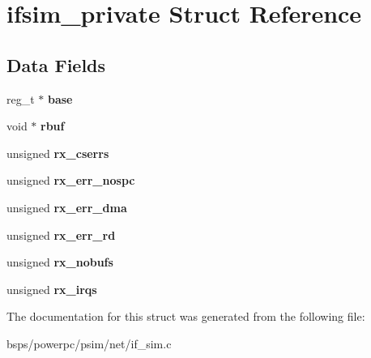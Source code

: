\hypertarget{structifsim__private}{}\section{ifsim\+\_\+private Struct Reference}
\label{structifsim__private}
\subsection*{Data Fields}
\begin{DoxyCompactItemize}
\item 
\mbox{\label{structifsim__private_aae16fc2284c01afe5cfd5db2201ff018}} 
reg\+\_\+t $\ast$ {\bfseries base}
\item 
\mbox{\label{structifsim__private_aa742aa15b1e258383748994f64aec7bd}} 
void $\ast$ {\bfseries rbuf}
\item 
\mbox{\label{structifsim__private_a11da12a32fbf75931f18bdc34ff4f230}} 
unsigned {\bfseries rx\+\_\+cserrs}
\item 
\mbox{\label{structifsim__private_ac74605dc2d7f81d4a65ba8f284dd116c}} 
unsigned {\bfseries rx\+\_\+err\+\_\+nospc}
\item 
\mbox{\label{structifsim__private_a1b791f95f0feb1fc3eece8d6ca388e49}} 
unsigned {\bfseries rx\+\_\+err\+\_\+dma}
\item 
\mbox{\label{structifsim__private_af9dc4c953c79ccfa3690772c97441ded}} 
unsigned {\bfseries rx\+\_\+err\+\_\+rd}
\item 
\mbox{\label{structifsim__private_afd936d04f6689314112d0cf4630d8371}} 
unsigned {\bfseries rx\+\_\+nobufs}
\item 
\mbox{\label{structifsim__private_a7d5e2b8b65719be33d16ab562cbc8de8}} 
unsigned {\bfseries rx\+\_\+irqs}
\end{DoxyCompactItemize}


The documentation for this struct was generated from the following file\+:\begin{DoxyCompactItemize}
\item 
bsps/powerpc/psim/net/if\+\_\+sim.\+c\end{DoxyCompactItemize}
